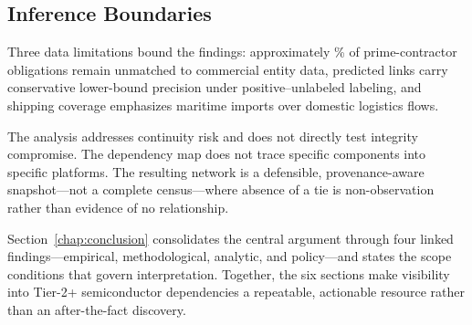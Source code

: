 \subsection*{Inference Boundaries}

Three data limitations bound the findings: approximately \UnmatchedPrimeShare\% of prime-contractor obligations remain unmatched to commercial entity data, predicted links carry conservative lower-bound precision under positive--unlabeled labeling, and shipping coverage emphasizes maritime imports over domestic logistics flows.

The analysis addresses continuity risk and does not directly test integrity compromise. The dependency map does not trace specific components into specific platforms. The resulting network is a defensible, provenance-aware snapshot---not a complete census---where absence of a tie is non-observation rather than evidence of no relationship.

Section~\ref{chap:conclusion} consolidates the central argument through four linked findings---empirical, methodological, analytic, and policy---and states the scope conditions that govern interpretation. Together, the six sections make visibility into Tier-2+ semiconductor dependencies a repeatable, actionable resource rather than an after-the-fact discovery.
